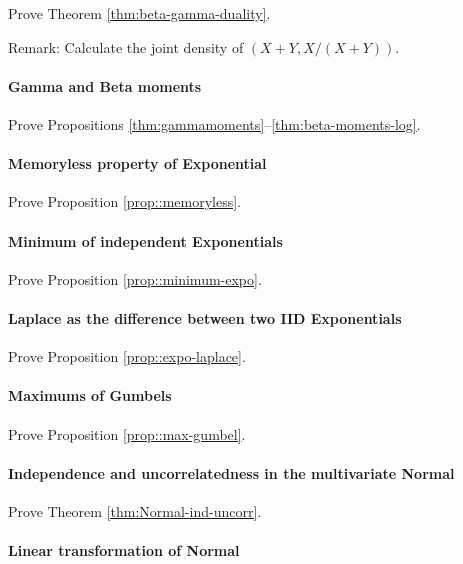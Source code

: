 Prove Theorem \ref{thm:beta-gamma-duality}.

Remark: Calculate the joint density of $(X+Y, X/(X+Y))$. 

\paragraph{Gamma and Beta moments}\label{hwmath2::beta-gamma-moments}

Prove Propositions \ref{thm:gammamoments}--\ref{thm:beta-moments-log}.


\paragraph{Memoryless property of Exponential}\label{hwmath2::memoryless-exponential}

Prove Proposition \ref{prop::memoryless}.




\paragraph{Minimum of independent Exponentials}\label{hwmath2::min-exponential}


Prove Proposition \ref{prop::minimum-expo}. 


\paragraph{Laplace as the difference between two IID Exponentials}\label{hwmath2::laplace-diff-exponential}


Prove Proposition \ref{prop::expo-laplace}. 




\paragraph{Maximums of Gumbels}\label{hwmath2::max-gumbel}

Prove Proposition \ref{prop::max-gumbel}. 




\paragraph{Independence and uncorrelatedness in the multivariate Normal}\label{hwmath2::independence-uncorr-normal}

Prove Theorem \ref{thm:Normal-ind-uncorr}. 


\paragraph{Linear transformation of Normal}\label{hwmath2::linear-normal}


